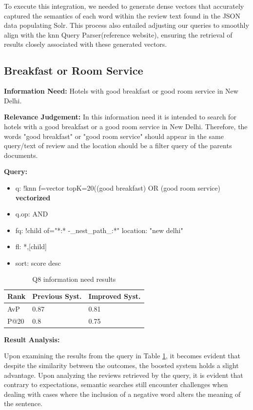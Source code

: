 \documentclass[sigconf]{acmart}
\begin{document}
To execute this integration, we needed to generate dense vectors that accurately captured the semantics of each word within the review text found in the JSON data populating Solr. This process also entailed adjusting our queries to smoothly align with the knn Query Parser(reference website), ensuring the retrieval of results closely associated with these generated vectors.

\renewcommand{\thesubsection}{\Alph{subsection}}

\setcounter{subsection}{0}
\subsection{Breakfast or Room Service}

\textbf{Information Need:} Hotels with good breakfast or good room service in New Delhi.

\textbf{Relevance Judgement:} In this information need it is intended to search for hotels with a good breakfast or a good room service in New Delhi. Therefore, the words "good breakfast" or "good room service" should appear in the same query/text of review and the location should be a filter query of the parents documents.

\textbf{Query:}

\begin{itemize}
    \item q: {!knn f=vector topK=20}((good breakfast) OR (good room service) \textbf{vectorized}
    \item q.op: AND
    \item fq: {!child of="*:* -\_nest\_path\_:*"} location: "new delhi"
    \item fl: *,[child]
    \item sort: score desc
\end{itemize}

\begin{table}[H]
\caption{Q8 information need results}
\label{tab:q8}
\begin{tabular}{lll}
\toprule
Rank & Previous Syst. & Improved Syst.\\
\midrule
AvP & 0.87 & 0.81  \\
P@20 & 0.8 & 0.75 \\
\bottomrule
\end{tabular}
\end{table}

\textbf{Result Analysis:} 

Upon examining the results from the query in Table \ref{tab:q8}, it becomes evident that despite the similarity between the outcomes, the boosted system holds a slight advantage.
Upon analyzing the reviews retrieved by the query, it is evident that contrary to expectations, semantic searches still encounter challenges when dealing with cases where the inclusion of a negative word alters the meaning of the sentence.
\end{document}
